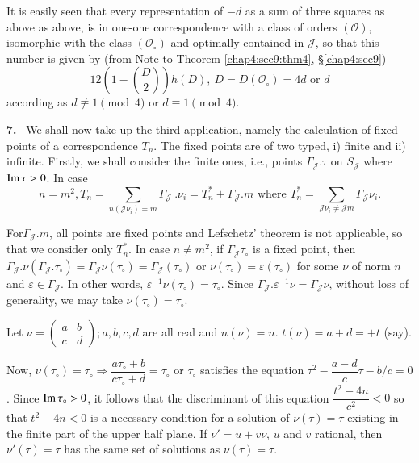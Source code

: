 It is easily seen that every representation of $-d$ as a sum of three
squares as above as above, is in one-one correspondence with a class
of orders $(\mathscr{O})$, isomorphic with the class
$(\mathscr{O}_\circ)$ and optimally contained in $\mathcal{J}$, so
that this number is given by (from Note to Theorem
\ref{chap4:sec9:thm4}, \S \ref{chap4:sec9}) 
$$
12 (1 - (\frac{D}{2})) h(D),~D=D(\mathscr{O}_\circ) = 4d \text{ or }d
$$
according as $d \not \equiv 1 \pmod 4$ or $d \equiv 1 \pmod 4$.

\textbf{7.} ~We shall now take up the third application, namely the
calculation of fixed points of a correspondence $T_n$. The fixed
points are of two typed, i) finite and ii) infinite. Firstly, we
shall consider the finite ones, i.e., points $\Gamma_\mathcal{J}. \tau
$ on $S_\mathcal{J}$ where $\operatorname{Im} \tau > 0$. In case 
$$
n= m^2, T_n = \sum_{n (\mathcal{J} \nu_i)=m} \Gamma_\mathcal{J}~. \nu_i =
T^*_n + \Gamma_\mathcal{J}. m \text{ where } T^*_n = \sum_{\mathcal{J}
  \nu_i \neq \mathcal{J}m} \Gamma_\mathcal{J} \nu_i. 
$$

For\pageoriginale $\Gamma_\mathcal{J}. m$, all points are fixed points and Lefschetz'
theorem is not applicable, so that we consider only $T^*_n$. In case
$n \neq m^2$, if $\Gamma_\mathcal{J} \tau_\circ$ is a fixed point, then
$\Gamma_\mathcal{J}. \nu (\Gamma_\mathcal{J}. \tau_\circ) =
\Gamma_\mathcal{J}\nu (\tau_\circ) = \Gamma_\mathcal{J}(\tau_\circ)$ or $\nu
(\tau_\circ) = \varepsilon (\tau_\circ)$ for some $\nu$ of norm $n$
and $\varepsilon\in \Gamma_\mathcal{J}$. In other words,
$\varepsilon^{-1} \nu(\tau_\circ) = \tau_\circ$. Since
$\Gamma_\mathcal{J}. \varepsilon^{-1}\nu = \Gamma_\mathcal{J} \nu$, without
loss of generality, we may take $\nu (\tau_\circ) = \tau_\circ$. 

Let $\nu = \begin{pmatrix} a & b \\ c & d \end{pmatrix}; a, b, c, d$
are all real and $n (\nu)=n$. $t(\nu) = a + d = + t$ (say). 

Now, $\nu (\tau_\circ) = \tau_\circ \Rightarrow \dfrac{a \tau_\circ +
  b}{c \tau_\circ +d} = \tau_\circ$ or $\tau_\circ$ satisfies the
equation $\tau^2 - \dfrac{a - d}{c} \tau -b/c = 0$. Since
$\operatorname{Im} \tau_\circ > 0$, it follows that the discriminant of this equation
$\dfrac{t^2 -4n}{c^2} < 0$ so that $t^2 -4n < 0$ is a necessary
condition for a solution of $\nu (\tau) = \tau$ existing in the finite
part of the upper half plane. If $\nu' = u + v \nu$, $u$ and $v$ rational,
then $\nu' (\tau) = \tau$ has the same set of solutions as $\nu (\tau
) = \tau$. 

